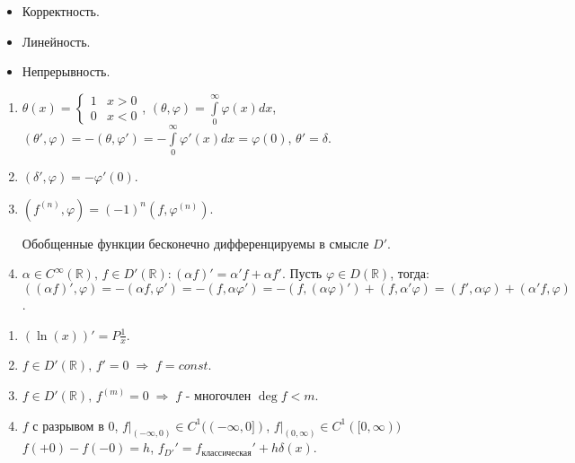 \begin{enumerate}
  \begin{itemize}
  \tightlist
  \item
    Корректность.
  \item
    Линейность.
  \item
    Непрерывность.
  \end{itemize}

  \begin{example}

  \begin{enumerate}
  \def\labelenumii{\arabic{enumii}.}
  \item
    \(\theta   (x)  =  \begin{cases}1  & x  >  0\\  0  & x  <  0\end{cases}\),
    \((\theta , \varphi )  =  \int \limits_{0}^{\infty } \varphi   (x) d x\),
    \((\theta ', \varphi )  =  -   (\theta , \varphi ')  =  -   \int \limits_{0}^{\infty } \varphi '  (x) d x  = \varphi   (0)\),
    \(\theta '  = \delta \).
  \item
    \((\delta ', \varphi )  =  -  \varphi '  (0)\).
  \item
    \((f^{(n)}, \varphi )  =  (-   1)^{n}  (f, \varphi ^{(n)})\).

    \begin{warning}

    Обобщенные функции бесконечно дифференцируемы в смысле \(D'\).

    \end{warning}
  \item
    \(\alpha   \in  C^{\infty }  (\mathbb{R} )  \text{,  } f  \in  D'  (\mathbb{R} )  \colon  (\alpha  f)'  = \alpha ' f  + \alpha  f'\).
    Пусть \(\varphi   \in  D  (\mathbb{R} )\), тогда:
    \(((\alpha  f)', \varphi )  =  -   (\alpha  f, \varphi ')  =  -   (f, \alpha  \varphi ')  =  -   (f,  (\alpha  \varphi )')  +  (f, \alpha ' \varphi )  =  (f', \alpha  \varphi )  +  (\alpha ' f, \varphi )\).
  \end{enumerate}

  \end{example}

  \begin{exercise}

  \begin{enumerate}
  \def\labelenumii{\arabic{enumii}.}
  \item
    \((\ln  (x))'  = P\frac{1}{x}\).
  \item
    \(f  \in  D'  (\mathbb{R} )  \text{,  } f'  =  0  \;  \Rightarrow   \; f  = const\).
  \item
    \(f  \in  D'  (\mathbb{R} )  \text{,  } f^{(m)}  =  0  \;  \Rightarrow   \; f  \text{  -  многочлен  }  \deg f  < m\).
  \item
    \(f\) с разрывом в \(0\),
    \(\left.f\right|_{(-   \infty ,  0)}  \in  C^{1}  ((-   \infty ,  0])\),
    \(\left.f\right|_{(0,  \infty )}  \in  C^{1}  ([0,  \infty ))\)
    \(f(+  0)  -  f(-   0)  = h\),
    \(f_{D'}'  = f_{\text{классическая}}'  + h \delta   (x)\).
  \end{enumerate}


\end{exercise}
\end{enumerate}
